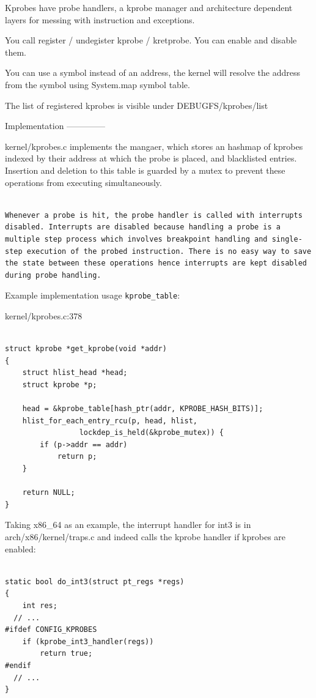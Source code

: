 Kprobes have probe handlers, a kprobe manager and architecture
dependent layers for messing with instruction and exceptions.

You call register / undegister kprobe / kretprobe. You can enable and
disable them.

You can use a symbol instead of an address, the kernel will resolve
the address from the symbol using System.map symbol table.

The list of registered kprobes is visible under DEBUGFS/kprobes/list


Implementation
--------------

kernel/kprobes.c implements the mangaer, which stores an hashmap of
kprobes indexed by their address at which the probe is placed, and
blacklisted entries. Insertion and deletion to this table is guarded
by a mutex to prevent these operations from executing simultaneously.

\begin{verbatim}

Whenever a probe is hit, the probe handler is called with interrupts disabled. Interrupts are disabled because handling a probe is a multiple step process which involves breakpoint handling and single-step execution of the probed instruction. There is no easy way to save the state between these operations hence interrupts are kept disabled during probe handling.

\end{verbatim}

Example implementation usage \verb|kprobe_table|:

kernel/kprobes.c:378

\begin{verbatim}

struct kprobe *get_kprobe(void *addr)
{
	struct hlist_head *head;
	struct kprobe *p;

	head = &kprobe_table[hash_ptr(addr, KPROBE_HASH_BITS)];
	hlist_for_each_entry_rcu(p, head, hlist,
				 lockdep_is_held(&kprobe_mutex)) {
		if (p->addr == addr)
			return p;
	}

	return NULL;
}

\end{verbatim}

Taking x86\_64 as an example, the interrupt handler for int3 is in
arch/x86/kernel/traps.c and indeed calls the kprobe handler if kprobes
are enabled:

\begin{verbatim}

static bool do_int3(struct pt_regs *regs)
{
	int res;
  // ...
#ifdef CONFIG_KPROBES
	if (kprobe_int3_handler(regs))
		return true;
#endif
  // ...
}

\end{verbatim}

